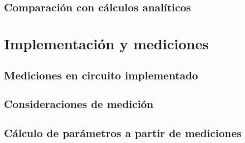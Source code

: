    \subsection{Comparación con cálculos analíticos}
  \section{Implementación y mediciones}
    \subsection{Mediciones en circuito implementado}
    \subsection{Consideraciones de medición}
    \subsection{Cálculo de parámetros a partir de mediciones}
